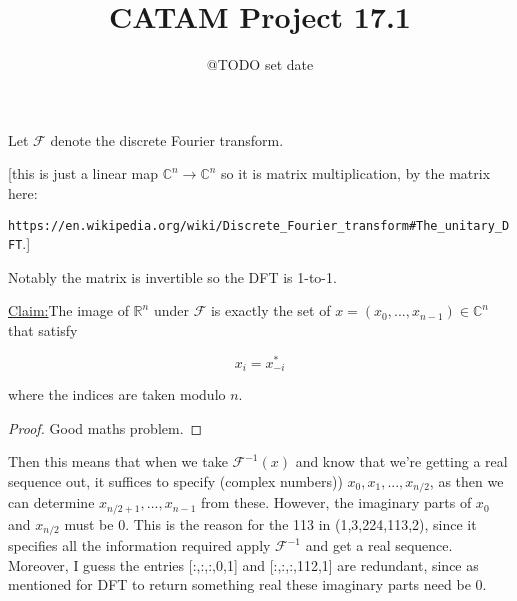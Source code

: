 \documentclass{article}
\title{\textbf{CATAM Project 17.1}}
\date{@TODO set date}
\newenvironment{claim}[1]{\par\noindent\underline{Claim:}\space#1}{}
\newcommand{\FF}{\mathcal{F}}
\newcommand{\CC}{\mathbb{C}}
\begin{document}
\tableofcontents

Let $\FF$ denote the discrete Fourier transform.

[this is just a linear map $\CC^n \to \CC^n$ so it is matrix multiplication, by the matrix here: 

\texttt{https://en.wikipedia.org/wiki/Discrete_Fourier_transform\#The_unitary_DFT}.] 

Notably the matrix is invertible so the DFT is 1-to-1.

\begin{claim}
The image of $\mathbb{R}^n$ under $\FF$ is exactly the set of $x = (x_0, ... , x_{n-1}) \in \CC^n$ that satisfy 

\begin{equation}
    x_i = x_{-i}^*
\end{equation}

where the indices are taken modulo $n$.
\end{claim}

\begin{proof}
    Good maths problem.
\end{proof}

Then this means that when we take $\FF^{-1}(x)$ and know that we're getting a real sequence out, it suffices to specify (complex numbers)) $x_0, x_1, ... , x_{n/2}$, as then we can determine $x_{n/2 + 1}, ... , x_{n-1}$ from these. However, the imaginary parts of $x_0$ and $x_{n/2}$ must be 0. This is the reason for the 113 in (1,3,224,113,2), since it specifies all the information required apply $\FF^{-1}$ and get a real sequence. Moreover, I guess the entries [:,:,:,0,1] and [:,:,:,112,1] are redundant, since as mentioned for DFT to return something real these imaginary parts need be 0.
\end{document}
